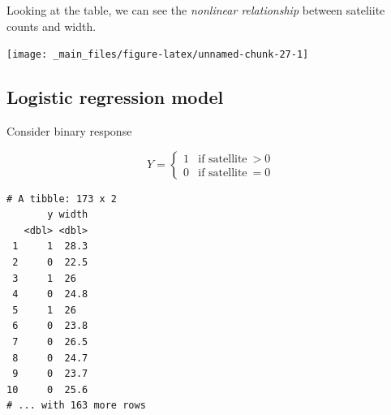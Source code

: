 \documentclass[]{book}
\newenvironment{Shaded}{\begin{snugshade}}{\end{snugshade}}
\newcommand{\DataTypeTok}[1]{\textcolor[rgb]{0.13,0.29,0.53}{#1}}
\newcommand{\DecValTok}[1]{\textcolor[rgb]{0.00,0.00,0.81}{#1}}
\newcommand{\FloatTok}[1]{\textcolor[rgb]{0.00,0.00,0.81}{#1}}
\newcommand{\KeywordTok}[1]{\textcolor[rgb]{0.13,0.29,0.53}{\textbf{#1}}}
\newcommand{\NormalTok}[1]{#1}
\newcommand{\OperatorTok}[1]{\textcolor[rgb]{0.81,0.36,0.00}{\textbf{#1}}}
\newcommand{\OtherTok}[1]{\textcolor[rgb]{0.56,0.35,0.01}{#1}}
\newcommand{\StringTok}[1]{\textcolor[rgb]{0.31,0.60,0.02}{#1}}
\begin{document}
Looking at the table, we can see the \emph{nonlinear relationship} between sateliite counts and width.

\begin{Shaded}
\end{Shaded}

\begin{center}\texttt{[image: \_main\_files/figure-latex/unnamed-chunk-27-1]} \end{center}

\hypertarget{logistic-regression-model-2}{%
\subsection{Logistic regression model}\label{logistic-regression-model-2}}

Consider binary response

\[Y = \begin{cases} 1 & \text{if satellite}\: > 0 \\ 0 & \text{if satellite}\: = 0 \end{cases}\]

\begin{Shaded}
\end{Shaded}

\begin{verbatim}
# A tibble: 173 x 2
       y width
   <dbl> <dbl>
 1     1  28.3
 2     0  22.5
 3     1  26  
 4     0  24.8
 5     1  26  
 6     0  23.8
 7     0  26.5
 8     0  24.7
 9     0  23.7
10     0  25.6
# ... with 163 more rows
\end{verbatim}
\end{document}
